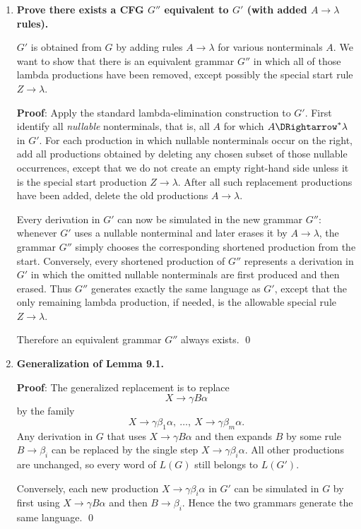 \begin{enumerate}[{9.}1. ]
\item \textbf{Prove there exists a CFG $G''$ equivalent to $G'$ (with added $A\to\lambda$ rules).}

$G'$ is obtained from $G$ by adding rules $A \to \lambda$ for various
nonterminals $A$. We want to show that there is an equivalent grammar $G''$ in
which all of those lambda productions have been removed, except possibly the
special start rule $Z\to\lambda$.

\textbf{Proof}: Apply the standard lambda-elimination construction to $G'$.
First identify all \emph{nullable} nonterminals, that is, all $A$ for which
$A\DRightarrow^* \lambda$ in $G'$.  For each production in which nullable
nonterminals occur on the right, add all productions obtained by deleting any
chosen subset of those nullable occurrences, except that we do not create an
empty right-hand side unless it is the special start production $Z\to\lambda$.
After all such replacement productions have been added, delete the old
productions $A\to\lambda$.

Every derivation in $G'$ can now be simulated in the new grammar $G''$: whenever
$G'$ uses a nullable nonterminal and later erases it by $A\to\lambda$, the
grammar $G''$ simply chooses the corresponding shortened production from the
start.  Conversely, every shortened production of $G''$ represents a derivation
in $G'$ in which the omitted nullable nonterminals are first produced and then
erased.  Thus $G''$ generates exactly the same language as $G'$, except that the
only remaining lambda production, if needed, is the allowable special rule
$Z\to\lambda$.

Therefore an equivalent grammar $G''$ always exists. \qed

\item \textbf{Generalization of Lemma 9.1.}

\textbf{Proof}: The generalized replacement is to replace
\[
X\to\gamma B\alpha
\]
by the family
\[
X\to\gamma\beta_1\alpha,\ \ldots,\ X\to\gamma\beta_m\alpha.
\]
Any derivation in $G$ that uses
$X\to\gamma B\alpha$ and then expands $B$ by some rule $B\to\beta_i$ can be
replaced by the single step
$X\to\gamma\beta_i\alpha$.  All other productions are unchanged, so every word
of $L(G)$ still belongs to $L(G')$.

Conversely, each new production $X\to\gamma\beta_i\alpha$ in $G'$ can be
simulated in $G$ by first using $X\to\gamma B\alpha$ and then
$B\to\beta_i$.  Hence the two grammars generate the same language. \qed


\end{enumerate}
